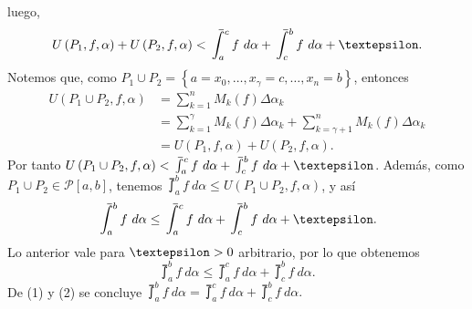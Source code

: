   luego,
  \begin{equation*}
    U\left(P_1,f,\alpha\right)+U\left(P_2,f,\alpha\right) < \upint_a^c f\ d\alpha + \upint_c^b f\ d\alpha + \text{\textepsilon}.
  \end{equation*}
  Notemos que, como $P_1\cup P_2=\left\lbrace a=x_0,\dots, x_\gamma=c,\dots, x_n=b\right\rbrace$, entonces
  \begin{align*}
    U\left(P_1\cup P_2,f,\alpha\right)&=\sum_{k=1}^n M_k\left(f\right)\Delta\alpha_k\\
    &=\sum_{k=1}^\gamma M_k\left(f\right)\Delta\alpha_k + \sum_{k=\gamma+1}^n M_k\left(f\right)\Delta\alpha_k\\
    &=U\left(P_1,f,\alpha\right)+U\left(P_2,f,\alpha\right).
  \end{align*}
  Por tanto $U\left(P_1\cup P_2,f,\alpha\right) < \upint_a^c f\ d\alpha + \upint_c^b f\ d\alpha + \text{\textepsilon}$. Además, como $P_1\cup P_2\in\mathcal{P}\left[a,b\right]$, tenemos $\upint_a^b f\ d\alpha \leq U\left(P_1\cup P_2,f,\alpha\right)$, y así
  \begin{equation*}
    \upint_a^b f\ d\alpha \leq \upint_a^c f\ d\alpha + \upint_c^b f\ d\alpha +\text{\textepsilon}.
  \end{equation*}
  Lo anterior vale para $\text{\textepsilon}>0$ arbitrario, por lo que obtenemos
  \setcounter{equation}{1}
  \begin{equation}
    \upint_a^b f\ d\alpha \leq \upint_a^c f\ d\alpha + \upint_c^b f\ d\alpha.
  \end{equation}
  De (1) y (2) se concluye $\upint_a^b f\ d\alpha = \upint_a^c f\ d\alpha + \upint_c^b f\ d\alpha.$
